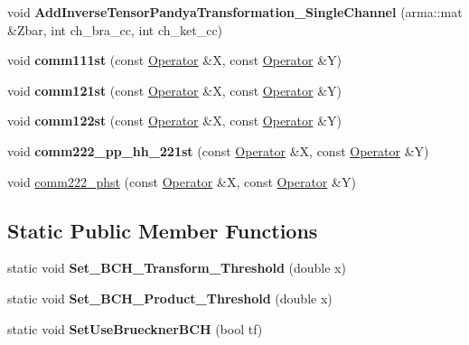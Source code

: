 \begin{DoxyCompactItemize}
\item 
void {\bfseries Add\+Inverse\+Tensor\+Pandya\+Transformation\+\_\+\+Single\+Channel} (arma\+::mat \&Zbar, int ch\+\_\+bra\+\_\+cc, int ch\+\_\+ket\+\_\+cc)\hypertarget{classOperator_a5d90f7e7e9e9bcfe814465ee7a271b60}{}\label{classOperator_a5d90f7e7e9e9bcfe814465ee7a271b60}

\item 
void {\bfseries comm111st} (const \hyperlink{classOperator}{Operator} \&X, const \hyperlink{classOperator}{Operator} \&Y)\hypertarget{classOperator_a9e365e6c594c517083fe6af1eb5907b2}{}\label{classOperator_a9e365e6c594c517083fe6af1eb5907b2}

\item 
void {\bfseries comm121st} (const \hyperlink{classOperator}{Operator} \&X, const \hyperlink{classOperator}{Operator} \&Y)\hypertarget{classOperator_aa2d57c0b2c5564d60e478eb10649ac3a}{}\label{classOperator_aa2d57c0b2c5564d60e478eb10649ac3a}

\item 
void {\bfseries comm122st} (const \hyperlink{classOperator}{Operator} \&X, const \hyperlink{classOperator}{Operator} \&Y)\hypertarget{classOperator_abc49b2355a2b45a6636fc99899a70616}{}\label{classOperator_abc49b2355a2b45a6636fc99899a70616}

\item 
void {\bfseries comm222\+\_\+pp\+\_\+hh\+\_\+221st} (const \hyperlink{classOperator}{Operator} \&X, const \hyperlink{classOperator}{Operator} \&Y)\hypertarget{classOperator_a18deafc783e666ae2f9021a2a5dec2cb}{}\label{classOperator_a18deafc783e666ae2f9021a2a5dec2cb}

\item 
void \hyperlink{classOperator_a85ffd47b8d0db4cdbb6ef4684adbedeb}{comm222\+\_\+phst} (const \hyperlink{classOperator}{Operator} \&X, const \hyperlink{classOperator}{Operator} \&Y)
\end{DoxyCompactItemize}
\subsection*{Static Public Member Functions}
\begin{DoxyCompactItemize}
\item 
static void {\bfseries Set\+\_\+\+B\+C\+H\+\_\+\+Transform\+\_\+\+Threshold} (double x)\hypertarget{classOperator_a6f505221635444cb0b489b9ac600fd61}{}\label{classOperator_a6f505221635444cb0b489b9ac600fd61}

\item 
static void {\bfseries Set\+\_\+\+B\+C\+H\+\_\+\+Product\+\_\+\+Threshold} (double x)\hypertarget{classOperator_a2c42843a1a557f2ab568d106e8fd23e8}{}\label{classOperator_a2c42843a1a557f2ab568d106e8fd23e8}

\item 
static void {\bfseries Set\+Use\+Brueckner\+B\+CH} (bool tf)\hypertarget{classOperator_a574e27d0c3ddc107b51eafcb6bfd4b99}{}\label{classOperator_a574e27d0c3ddc107b51eafcb6bfd4b99}

\end{DoxyCompactItemize}
